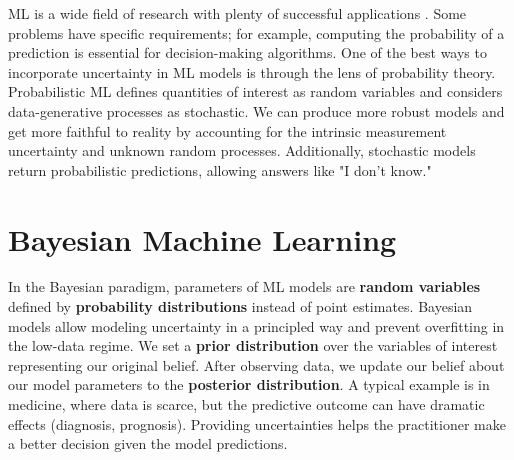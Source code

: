 

\ifpdf
    \graphicspath{{chapters/1_introduction/figures/}}
\else
    \graphicspath{{1_introduction/figures/EPS/}{1_introduction/figures/}}
\fi

\ac{ML} is a wide field of research with plenty of successful applications \cite{jordan2015machine}.
Some problems have specific requirements; for example, computing the probability of a prediction is essential for decision-making algorithms.
One of the best ways to incorporate uncertainty in \ac{ML} models is through the lens of probability theory.
Probabilistic \ac{ML} defines quantities of interest as random variables and considers data-generative processes as stochastic.
We can produce more robust models and get more faithful to reality by accounting for the intrinsic measurement uncertainty and unknown random processes.
Additionally, stochastic models return probabilistic predictions, allowing answers like "I don't know."

\section{Bayesian Machine Learning}

In the Bayesian paradigm, parameters of \ac{ML} models are \textbf{random variables} defined by \textbf{probability distributions} instead of point estimates.
Bayesian models allow modeling uncertainty in a principled way and prevent overfitting in the low-data regime.
We set a \textbf{prior distribution} over the variables of interest representing our original belief.
After observing data, we update our belief about our model parameters to the \textbf{posterior distribution}.
A typical example is in medicine, where data is scarce, but the predictive outcome can have dramatic effects (diagnosis, prognosis).
Providing uncertainties helps the practitioner make a better decision given the model predictions.

